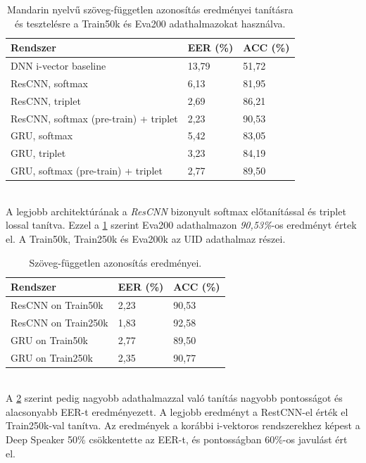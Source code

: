 \begin{table}[!ht]
	\begin{tabular}{*3l} \toprule
		\bfseries Rendszer & \bfseries EER (\%) & \bfseries ACC (\%) \\ \midrule
		DNN i-vector baseline & 13,79 & 51,72 \\
		\rowcolor{gray!10}
		ResCNN, softmax & 6,13 & 81,95 \\
		ResCNN, triplet & 2,69 & 86,21 \\
		\rowcolor{gray!10}
		ResCNN, softmax (pre-train) + triplet & 2,23 & 90,53 \\
		GRU, softmax & 5,42 & 83,05 \\
		GRU, triplet & 3,23 & 84,19 \\
		\rowcolor{gray!10}
		GRU, softmax (pre-train) + triplet & 2,77 & 89,50 \\
		\bottomrule
		\hline
	\end{tabular}
	\centering
	\caption{Mandarin nyelvű szöveg-független azonosítás eredményei tanításra és tesztelésre a Train50k és Eva200 adathalmazokat használva.}
	\label{fig:deep-speaker-independent-mandarin-results}
\end{table}
\newpage
\ \\
A legjobb architektúrának a \emph{ResCNN} bizonyult softmax előtanítással és triplet lossal tanítva. Ezzel a \ref{fig:deep-speaker-independent-mandarin-results} szerint Eva200 adathalmazon \emph{90,53\%}-os eredményt értek el. A Train50k, Train250k és Eva200k az UID adathalmaz részei.

\begin{table}[!ht]
	\begin{tabular}{*3l} \toprule
		\bfseries Rendszer & \bfseries EER (\%) & \bfseries ACC (\%) \\ \midrule
		ResCNN on Train50k & 2,23 & 90,53 \\
		\rowcolor{gray!10} 
		ResCNN on Train250k & 1,83 & 92,58 \\
		GRU on Train50k & 2,77 & 89,50 \\
		\rowcolor{gray!10} 
		GRU on Train250k & 2,35 & 90,77 \\
		\bottomrule
		\hline
	\end{tabular}
	\centering
	\caption{Szöveg-független azonosítás eredményei.}
	\label{fig:deep-speaker-independent}
\end{table}
\ \\
A \ref{fig:deep-speaker-independent} szerint pedig nagyobb adathalmazzal való tanítás nagyobb pontosságot és alacsonyabb EER-t eredményezett. A legjobb eredményt a RestCNN-el érték el Train250k-val tanítva.
\newline
\newline
Az eredmények a korábbi i-vektoros rendszerekhez képest a Deep Speaker 50\% csökkentette az EER-t, és pontosságban 60\%-os javulást ért el.

